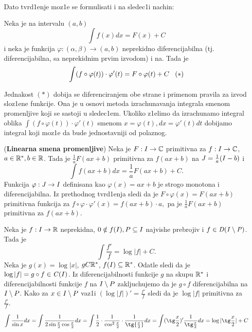 \documentclass[../main.tex]{subfiles}
\begin{document}
Dato tvrd1enje moz1e se formulisati i na sledec1i nachin:
\begin{tvr}
Neka je na intervalu $(a,b)$ 
$$\int f(x) dx=F(x)+C$$
i neka je funkcija $\varphi:(\alpha, \beta)\to(a,b)$ neprekidno diferencijabilna (tj. diferencijabilna, sa neprekidnim prvim izvodom) i na. Tada je
$$\int(f\circ \varphi(t))\cdot \varphi'(t)=F\circ \varphi(t) +C
\hspace{0.3cm} (*)$$
\end{tvr}
Jednakost $(*)$ dobija se diferenciranjem obe strane i primenom pravila za izvod sloz1ene funkcije. Ona je u osnovi metoda izrachunavanja integrala smenom promenljive koji se sastoji u sledec1em. 
Ukoliko z1elimo da izrachunamo integral oblika $\int(f\circ \varphi(t))\cdot \varphi'(t)$ smenom $x=\varphi(t), dx=\varphi'(t) dt$
dobijamo integral koji moz1e da bude jednostavniji od polaznog.
\begin{pr}
(\textbf{Linearna smena promenljive}) Neka je $F:I\to \mathbb{C}$ primitivna
za $f:I\to \mathbb{C}$, $a\in \mathbb{R}^*, b \in \mathbb{R}$. Tada je $\frac{1}{a}F(ax+b)$
primitivna za $f(ax+b)$ na $\mathit{J}=\frac{1}{a}(I-b)$ i
$$\int f(ax+b) dx=\frac{1}{a}F(ax+b)+C.$$
Funkcija $\varphi:\mathit{J} \to I$ definisana kao $\varphi(x)=ax+b$ je strogo monotona i
diferencijabilna. Iz prethodnog tvrd1enja sledi da je 
$F\circ \varphi(x)=F(ax+b)$ primitivna funkcija za $f\circ \varphi \cdot \varphi'(x)=f(ax+b)\cdot a ,$ pa je $\frac{1}{a}F(ax+b)$ 
primitivna za $f(ax+b)$.
\end{pr}
\begin{pr}
Neka je $f:I\to \mathbb{R}$ neprekidna, $0\notin f(I), P\subseteq I$ najvishe prebrojiv i $f\in \it{D} (I\setminus P)$. Tada je 
$$\int \frac{f'}{f}=\log|f|+C.$$
Neka je $g(x)=\log|x|$, $gC\mathbb{R}^*$, $f(I)\subseteq \mathbb{R}^*$. Odatle sledi da je
$\log|f|=g\circ f \in \mathit{C}(I)$. Iz diferencijabilnosti funkcije $g$
na skupu $\mathbb{R}^*$ i diferencijabilnosti funkcije $f$ na $I\setminus P$ zakljuchujemo da je $g\circ f$ diferencijabilna na $I
\setminus P$.
Kako za $x \in I\setminus P$ vaz1i $(\log|f|)'=\frac{f'}{f}$ sledi da je $\log|f|$ primitivna za $\frac{f'}{f}$.
\end{pr}
\begin{pr}
$$\int \frac{1}{\sin x} dx = \int \frac{1}{2 \sin{\frac{x}{2}}\cos{\frac{x}{2}}}dx = \int \frac{1}{2} \cdot 
\frac{1}{\cos^2{\frac{x}{2}}} \cdot \frac{1}{\tg{\frac{x}{2}}} dx
= \int (\tg\frac{x}{2})'\frac{1}{\tg\frac{x}{2}} dx = \log|\tg\frac{x}{2}|+C$$

\end{pr}
\end{document}
